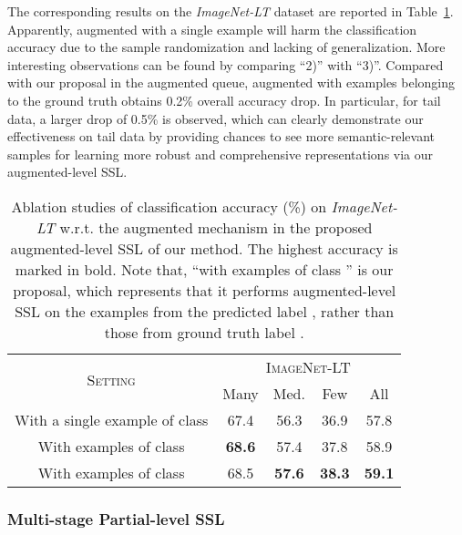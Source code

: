\documentclass[10pt,journal,compsoc]{IEEEtran}
\begin{document}
The corresponding results on the \emph{ImageNet-LT} dataset are reported in Table~\ref{table:queue}. Apparently, augmented with a single example will harm the classification accuracy due to the sample randomization and lacking of generalization. More interesting observations can be found by comparing ``2)'' with ``3)''. Compared with our proposal in the augmented queue, augmented with examples belonging to the ground truth obtains 0.2\% overall accuracy drop. In particular, for tail data, a larger drop of 0.5\% is observed, which can clearly demonstrate our effectiveness on tail data by providing chances to see more semantic-relevant samples for learning more robust and comprehensive representations via our augmented-level SSL.

\begin{table}[t]
\centering
\small
\renewcommand\arraystretch{1.1}
\setlength{\tabcolsep}{4.5pt}
\caption{\small Ablation studies of classification accuracy (\%) on \emph{ImageNet-LT} w.r.t. the augmented mechanism in the proposed augmented-level SSL of our method. The highest accuracy is marked in bold. Note that, ``with examples of class '' is our proposal, which represents that it performs augmented-level SSL on the examples from the predicted label , rather than those from ground truth label .}
\begin{tabular}{c|cccc}
\toprule
\multirow{2}{*}{\textsc{Setting}} & \multicolumn{4}{c}{\textsc{ImageNet-LT}}                    \\
                                  & \textsf{Many} & \textsf{Med.} & \textsf{Few} & \textsf{All} \\
\hline
With a single example of class                & 67.4        & 56.3          & 36.9         & 57.8    \bigstrut[t] \\
With examples of class         & \textbf{68.6}           & 57.4          & 37.8         & 58.9         \\
With examples of class        & 68.5          & \textbf{57.6}          & \textbf{38.3}         & \textbf{59.1}        \\
\bottomrule           
\end{tabular}
\label{table:queue}
\end{table}

\subsubsection{Multi-stage Partial-level SSL}
\end{document}
